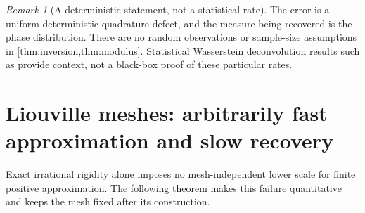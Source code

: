 \documentclass[11pt,a4paper]{article}
\numberwithin{equation}{section}
\theoremstyle{plain}
\theoremstyle{definition}
\theoremstyle{remark}
\newtheorem{remark}[theorem]{Remark}
\begin{document}
\begin{remark}[A deterministic statement, not a statistical rate]
The error is a uniform deterministic quadrature defect, and the measure being
recovered is the phase distribution. There are no random observations or
sample-size assumptions in \cref{thm:inversion,thm:modulus}. Statistical
Wasserstein deconvolution results such as \cite{rousseau} provide context,
not a black-box proof of these particular rates.
\end{remark}

\section{Liouville meshes: arbitrarily fast approximation and slow recovery}
\label{sec:liouville}

Exact irrational rigidity alone imposes no mesh-independent lower scale for
finite positive approximation. The following theorem makes this failure
quantitative and keeps the mesh fixed after its construction.
\end{document}
